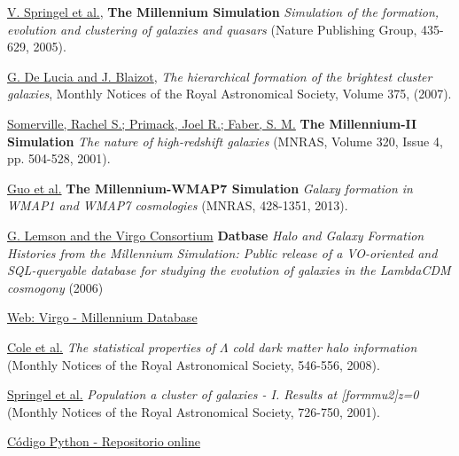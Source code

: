 \begin{thebibliography}{9}
\href{https://ui.adsabs.harvard.edu/abs/2005Natur.435..629S/abstract}{V. Springel et al.},
\textbf{The Millennium Simulation}
\textit{Simulation of the formation, evolution and clustering of galaxies and quasars}
(Nature Publishing Group, 435-629, 2005).

\href{https://ui.adsabs.harvard.edu/abs/2007MNRAS.375....2D/abstract}{G. De Lucia and J. Blaizot},
\textit{The hierarchical formation of the brightest cluster galaxies},
Monthly Notices of the Royal Astronomical Society, Volume 375, (2007).

\href{https://ui.adsabs.harvard.edu/abs/2001MNRAS.320..504S/abstract}{Somerville, Rachel S.; Primack, Joel R.; Faber, S. M.} 
\textbf{The Millennium-II Simulation}
\textit{The nature of high-redshift galaxies}
(MNRAS, Volume 320, Issue 4, pp. 504-528, 2001).

\href{https://ui.adsabs.harvard.edu/abs/2013MNRAS.428.1351G/abstract}{Guo et al.} 
\textbf{The Millennium-WMAP7 Simulation}
\textit{Galaxy formation in WMAP1 and WMAP7 cosmologies}
(MNRAS, 428-1351, 2013).

\href{https://ui.adsabs.harvard.edu/abs/2006astro.ph..8019L/abstract}{G. Lemson and the Virgo Consortium} 
\textbf{Datbase}
\textit{Halo and Galaxy Formation Histories from the Millennium Simulation: Public release of a VO-oriented and SQL-queryable database for studying the evolution of galaxies in the LambdaCDM cosmogony}
(2006)

\href{http://gavo.mpa-garching.mpg.de/Millennium/}{Web: Virgo - Millennium Database}

\href{https://ui.adsabs.harvard.edu/abs/2008MNRAS.383..546C/abstract}{Cole et al.} 
\textit{The statistical properties of $\Lambda$ cold dark matter halo information}
(Monthly Notices of the Royal Astronomical Society, 546-556, 2008).

\href{https://ui.adsabs.harvard.edu/abs/2001MNRAS.328..726S/abstract}{Springel et al.} 
\textit{Population a cluster of galaxies - I. Results at [formmu2]z=0}
(Monthly Notices of the Royal Astronomical Society, 726-750, 2001).

\href{https://github.com/Labalor/MillenniumSimulation/}{Código Python - Repositorio online}

\end{thebibliography}

